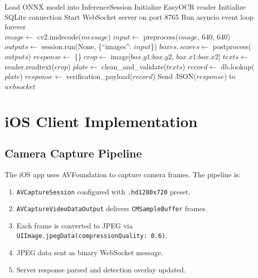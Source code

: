 \begin{algorithm}[H]
\caption{WebSocket Server Main Loop}
\begin{algorithmic}[1]
    \State Load ONNX model into InferenceSession
    \State Initialize EasyOCR reader
    \State Initialize SQLite connection
    \State Start WebSocket server on port 8765
    \State Run asyncio event loop forever
\EndFunction
\\
        \State $image \gets$ cv2.imdecode($message$)
        \State $input \gets$ preprocess($image$, 640, 640)
        \State $outputs \gets$ session.run(None, \{``images'': $input$\})
        \State $boxes, scores \gets$ postprocess($outputs$)
        \State $response \gets$ \{\}
            \State $crop \gets$ image[$box.y1$:$box.y2$, $box.x1$:$box.x2$]
            \State $texts \gets$ reader.readtext($crop$)
            \State $plate \gets$ clean\_and\_validate($texts$)
                \State $record \gets$ db.lookup($plate$)
                    \State $response \gets$ verification\_payload($record$)
                \EndIf
            \EndIf
        \EndFor
        \State Send JSON($response$) to $websocket$
    \EndFor
\EndFunction
\end{algorithmic}
\end{algorithm}

\section{iOS Client Implementation}
\subsection{Camera Capture Pipeline}
The iOS app uses AVFoundation to capture camera frames. The pipeline is:
\begin{enumerate}
    \item \texttt{AVCaptureSession} configured with \texttt{.hd1280x720} preset.
    \item \texttt{AVCaptureVideoDataOutput} delivers \texttt{CMSampleBuffer} frames.
    \item Each frame is converted to JPEG via \texttt{UIImage.jpegData(compressionQuality: 0.6)}.
    \item JPEG data sent as binary WebSocket message.
    \item Server response parsed and detection overlay updated.
\end{enumerate}

